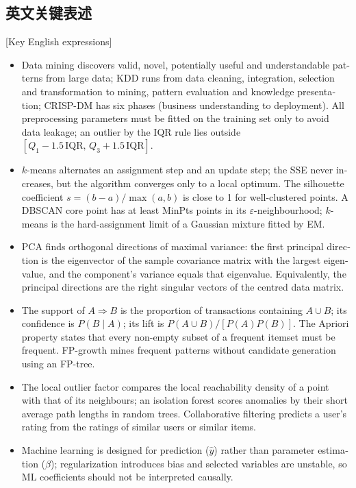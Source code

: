 \subsection{英文关键表述}
\begin{english}[Key English expressions]
\footnotesize
\begin{itemize}
\item Data mining discovers valid, novel, potentially useful and understandable patterns from large data; KDD runs from data cleaning, integration, selection and transformation to mining, pattern evaluation and knowledge presentation; CRISP-DM has six phases (business understanding to deployment). All preprocessing parameters must be fitted on the training set only to avoid data leakage; an outlier by the IQR rule lies outside $[Q_1-1.5\,\mathrm{IQR},\,Q_3+1.5\,\mathrm{IQR}]$.
\item $k$-means alternates an assignment step and an update step; the SSE never increases, but the algorithm converges only to a local optimum. The silhouette coefficient $s=(b-a)/\max(a,b)$ is close to 1 for well-clustered points. A DBSCAN core point has at least MinPts points in its $\varepsilon$-neighbourhood; $k$-means is the hard-assignment limit of a Gaussian mixture fitted by EM.
\item PCA finds orthogonal directions of maximal variance: the first principal direction is the eigenvector of the sample covariance matrix with the largest eigenvalue, and the component's variance equals that eigenvalue. Equivalently, the principal directions are the right singular vectors of the centred data matrix.
\item The support of $A\Rightarrow B$ is the proportion of transactions containing $A\cup B$; its confidence is $P(B\mid A)$; its lift is $P(A\cup B)/[P(A)P(B)]$. The Apriori property states that every non-empty subset of a frequent itemset must be frequent. FP-growth mines frequent patterns without candidate generation using an FP-tree.
\item The local outlier factor compares the local reachability density of a point with that of its neighbours; an isolation forest scores anomalies by their short average path lengths in random trees. Collaborative filtering predicts a user's rating from the ratings of similar users or similar items.
\item Machine learning is designed for prediction ($\hat y$) rather than parameter estimation ($\hat\beta$); regularization introduces bias and selected variables are unstable, so ML coefficients should not be interpreted causally.

\end{itemize}
\end{english}
